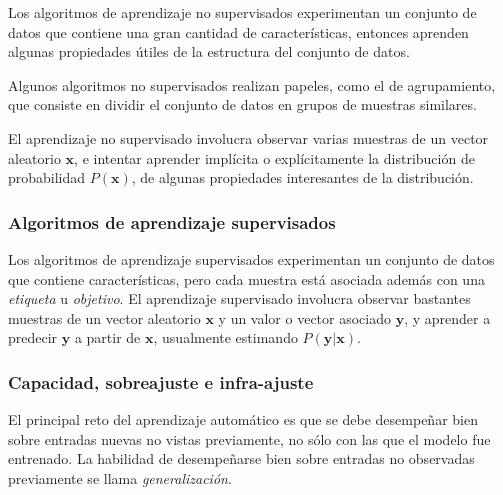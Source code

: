 
\begin{remark}
Los algoritmos de aprendizaje no supervisados experimentan un conjunto
de datos que contiene una gran cantidad de características, entonces aprenden algunas
propiedades útiles de la estructura del conjunto de datos. 
\end{remark}

Algunos
algoritmos no supervisados realizan papeles, como el de agrupamiento,
que consiste en dividir el conjunto de datos en grupos de muestras
similares.\\

\begin{remark}
El aprendizaje no supervisado involucra observar
varias muestras de un vector aleatorio $\mathbf{x}$, e intentar aprender implícita
o explícitamente la distribución de probabilidad $P(\mathbf{x})$, de algunas
propiedades interesantes de la distribución.
\end{remark}


\subsubsection{Algoritmos de aprendizaje
supervisados}

\begin{remark}
Los algoritmos de aprendizaje supervisados experimentan un conjunto de
datos que contiene características, pero cada muestra está asociada además con
una \textit{etiqueta} u \textit{objetivo}.
El aprendizaje supervisado involucra observar bastantes muestras de un
vector aleatorio $\mathbf{x}$ y un valor o vector asociado $\mathbf{y}$, y aprender a
predecir $\mathbf{y}$ a partir de $\mathbf{x}$, usualmente estimando $P(\mathbf{y} |\mathbf{x})$.
\end{remark}



\subsubsection{Capacidad, sobreajuste e
infra-ajuste}

El principal reto del aprendizaje automático es que se debe desempeñar
bien sobre entradas nuevas no vistas previamente, no sólo con las que el
modelo fue entrenado. La habilidad de desempeñarse bien sobre entradas
no observadas previamente se llama \textit{generalización}.

